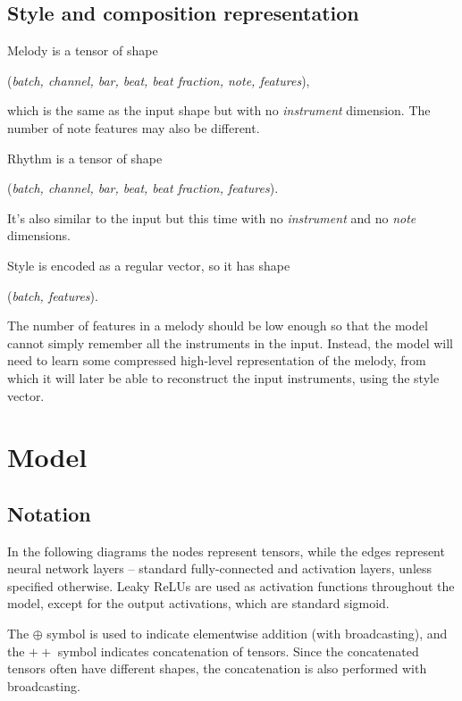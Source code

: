 \documentclass[en]{pracamgr}
\begin{document}
\section{Style and composition representation}

Melody is a tensor of shape
\begin{center}
    (\emph{batch, channel, bar, beat, beat fraction, note, features}),
\end{center}
which is the same as the input shape but with no \emph{instrument} dimension.
The number of note features may also be different.

Rhythm is a tensor of shape
\begin{center}
    (\emph{batch, channel, bar, beat, beat fraction, features}).
\end{center}
It's also similar to the input but this time with no \emph{instrument} and no \emph{note} dimensions.

Style is encoded as a regular vector, so it has shape
\begin{center}
    (\emph{batch, features}).
\end{center}

The number of features in a melody should be low enough so that the model cannot simply remember all the instruments in the input.
Instead, the model will need to learn some compressed high-level representation of the melody, from which it will later be able to reconstruct the input instruments, using the style vector.

\chapter{Model}

\section{Notation}

In the following diagrams the nodes represent tensors, while the edges represent neural network layers -- standard fully-connected and activation layers, unless specified otherwise.
Leaky ReLUs are used as activation functions throughout the model, except for the output activations, which are standard sigmoid.

The $\oplus$ symbol is used to indicate elementwise addition (with broadcasting), and the $++$ symbol indicates concatenation of tensors.
Since the concatenated tensors often have different shapes, the concatenation is also performed with broadcasting.
\end{document}
